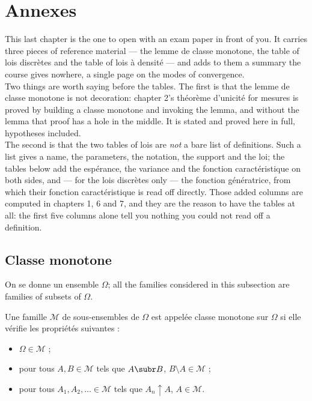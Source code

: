 \section{Annexes}
This last chapter is the one to open with an exam paper in front of you. It carries
three pieces of reference material --- the lemme de classe monotone, the table of
lois discrètes and the table of lois à densité --- and adds to them a summary the
course gives nowhere, a single page on the modes of convergence.\\
Two things are worth saying before the tables. The first is that the lemme de
classe monotone is not decoration: chapter 2's théorème d'unicité for mesures is
proved by building a classe monotone and invoking the lemma, and without the lemma
that proof has a hole in the middle. It is stated and proved here in full,
hypotheses included.\\
The second is that the two tables of lois are \emph{not} a bare list of
definitions. Such a list gives a name, the parameters, the notation, the support
and the loi; the tables below add the espérance, the variance and the
fonction caractéristique on both sides, and --- for the lois discrètes only --- the
fonction génératrice, from which their fonction caractéristique is read off
directly. Those added columns are computed in chapters 1, 6 and 7, and they are
the reason to have the tables at all: the first five columns alone tell you nothing
you could not read off a definition.

\subsection{Classe monotone}
On se donne un ensemble $\Omega$; all the families considered in this subsection
are families of subsets of $\Omega$.

\begin{definition}
  Une famille $\mathcal{M}$ de sous-ensembles de $\Omega$ est appelée classe
  monotone sur $\Omega$ si elle vérifie les propriétés suivantes :
  \begin{itemize}
    \item $\Omega \in \mathcal{M}$ ;
    \item pour tous $A, B \in \mathcal{M}$ tels que $A \subr B$,
      $B \setminus A \in \mathcal{M}$ ;
    \item pour tous $A_{1}, A_{2}, \dots \in \mathcal{M}$ tels que
      $A_{n} \uparrow A$, $A \in \mathcal{M}$.
  \end{itemize}
\end{definition}

